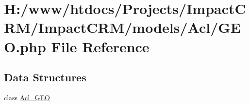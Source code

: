 \hypertarget{GEO_8php}{
\section{H:/www/htdocs/Projects/ImpactCRM/ImpactCRM/models/Acl/GEO.php File Reference}
\label{GEO_8php}
}
\subsection*{Data Structures}
\begin{DoxyCompactItemize}
\item 
class \hyperlink{classAcl__GEO}{Acl\_\-GEO}
\end{DoxyCompactItemize}
